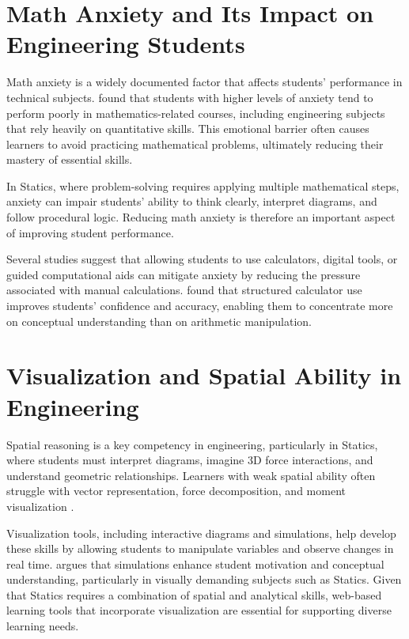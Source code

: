 
\section{Math Anxiety and Its Impact on Engineering Students}

Math anxiety is a widely documented factor that affects students’ performance in technical subjects. \cite{incierto_mathematics_nodate} found that students with higher levels of anxiety tend to perform poorly in mathematics-related courses, including engineering subjects that rely heavily on quantitative skills. This emotional barrier often causes learners to avoid practicing mathematical problems, ultimately reducing their mastery of essential skills.

In Statics, where problem-solving requires applying multiple mathematical steps, anxiety can impair students’ ability to think clearly, interpret diagrams, and follow procedural logic. Reducing math anxiety is therefore an important aspect of improving student performance.

Several studies suggest that allowing students to use calculators, digital tools, or guided computational aids can mitigate anxiety by reducing the pressure associated with manual calculations. \cite{segarra_does_2024} found that structured calculator use improves students’ confidence and accuracy, enabling them to concentrate more on conceptual understanding than on arithmetic manipulation.


\section{Visualization and Spatial Ability in Engineering}

Spatial reasoning is a key competency in engineering, particularly in Statics, where students must interpret diagrams, imagine 3D force interactions, and understand geometric relationships. Learners with weak spatial ability often struggle with vector representation, force decomposition, and moment visualization \autocite{fontaine_correlating_2024}.

Visualization tools, including interactive diagrams and simulations, help develop these skills by allowing students to manipulate variables and observe changes in real time. \cite{zeichner_using_2020} argues that simulations enhance student motivation and conceptual understanding, particularly in visually demanding subjects such as Statics. Given that Statics requires a combination of spatial and analytical skills, web-based learning tools that incorporate visualization are essential for supporting diverse learning needs.

